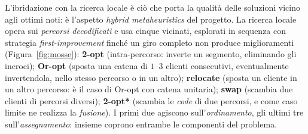 \documentclass[10pt,a4paper]{article}
\begin{document}
L'ibridazione con la ricerca locale è ciò che porta la qualità delle soluzioni
vicino agli ottimi noti: è l'aspetto \emph{hybrid metaheuristics} del progetto.
La ricerca locale opera sui \emph{percorsi decodificati} e usa cinque vicinati,
esplorati in sequenza con strategia \emph{first-improvement} finché un giro
completo non produce miglioramenti (Figura~\ref{fig:mosse}): \textbf{2-opt}
(intra-percorso: inverte un segmento, eliminando gli incroci); \textbf{Or-opt}
(sposta una catena di $1$--$3$ clienti consecutivi, eventualmente invertendola,
nello stesso percorso o in un altro); \textbf{relocate} (sposta un cliente in un
altro percorso: è il caso di Or-opt con catena unitaria); \textbf{swap} (scambia
due clienti di percorsi diversi); \textbf{2-opt*} (scambia le \emph{code} di due
percorsi, e come caso limite ne realizza la \emph{fusione}). I primi due agiscono
sull'\emph{ordinamento}, gli ultimi tre sull'\emph{assegnamento}: insieme coprono
entrambe le componenti del problema.
\end{document}
